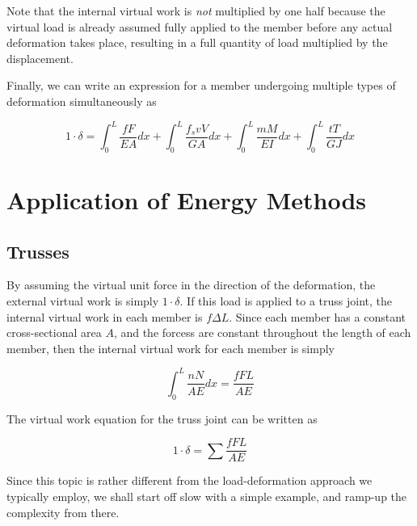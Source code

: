 \documentclass[
10pt,
a4paper,
openany,
svgnames,
]{book} %
\begin{document}
Note that the internal virtual work is \emph{not} multiplied by one half because the virtual load is already assumed fully applied to the member before any actual deformation takes place, resulting in a full quantity of load multiplied by the displacement.

Finally, we can write an expression for a member undergoing multiple types of deformation simultaneously as

\begin{equation}
  1 \cdot \delta = \int_0^L \frac{fF}{EA} dx + \int_0^L \frac{f_s vV}{GA} dx + \int_0^L \frac{mM}{EI} dx + \int_0^L \frac{tT}{GJ} dx
\end{equation}

\section{Application of Energy Methods}

\subsection{Trusses}

By assuming the virtual unit force in the direction of the deformation, the external virtual work is simply $1 \cdot \delta$. If this load is applied to a truss joint, the internal virtual work in each member is $f \Delta L$. Since each member has a constant cross-sectional area $A$, and the forcess are constant throughout the length of each member, then the internal virtual work for each member is simply

\begin{equation*}
  \int_0^L \frac{nN}{AE} dx = \frac{fFL}{AE}
\end{equation*}

The virtual work equation for the truss joint can be written as

\begin{equation}
  1 \cdot \delta = \sum \frac{fFL}{AE}
\end{equation}

Since this topic is rather different from the load-deformation approach we typically employ, we shall start off slow with a simple example, and ramp-up the complexity from there.
\end{document}
